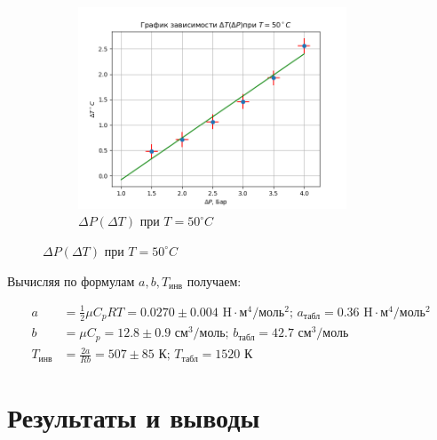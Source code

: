 \begin{figure}
    \begin{subfigure}{0.45\linewidth}
        \includegraphics[width=8cm]{plot4.png} 
        \caption{$\Delta P(\Delta T)$ при $T = 50^\circ C$}
    \end{subfigure}
\end{figure}

\indent
Вычисляя по формулам $a, b, T_{\text{инв}}$ получаем:

\begin{align}
    a &= \frac{1}{2} \mu C_{p} R T = 0.0270 \pm 0.004 \text{ H$\cdot$м$^4$/моль$^2$; }a_{\text{табл}} = 0.36 \text{ H$\cdot$м$^4$/моль$^2$}\\[10pt]
    b &= \mu C_{p} = 12.8 \pm 0.9\text{ см$^3$/моль; }b_{\text{табл}} = 42.7 \text{ см$^3$/моль}\\[10pt]
    T_{\text{инв}} &= \frac{2a}{Rb} = 507 \pm 85\text{ К; }T_{\text{табл}} = 1520 \text{ К}
\end{align}

\section*{Результаты и выводы}


